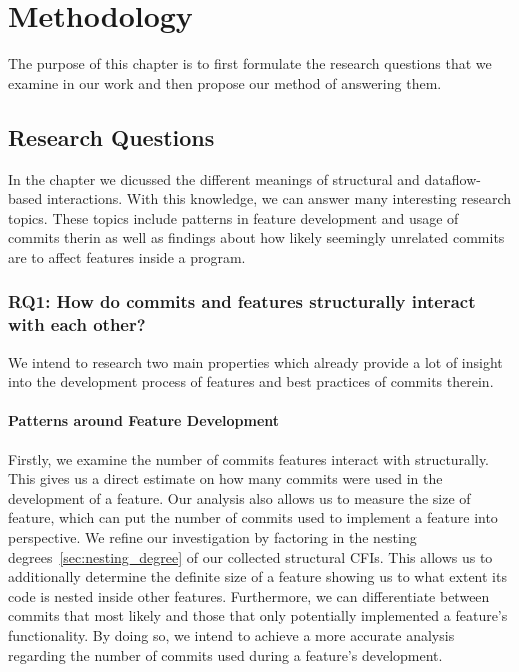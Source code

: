 \chapter{Methodology}\label{ch:methodology}

The purpose of this chapter is to first formulate the research questions that we examine in our work
and then propose our method of answering them.

\section{Research Questions}\label{sec:research_questions}

In the  chapter we dicussed the different meanings of structural and dataflow-based interactions.
With this knowledge, we can answer many interesting research topics. 
These topics include patterns in feature development and usage of commits therin as well as findings about how likely seemingly unrelated commits are to affect features inside a program.

\subsection*{\textbf{RQ1: How do commits and features structurally interact with each other?}}

We intend to research two main properties which already provide a lot of insight into the development process of features and best practices of commits therein.

\subsubsection*{Patterns around Feature Development}

Firstly, we examine the number of commits features interact with structurally. 
This gives us a direct estimate on how many commits were used in the development of a feature.
Our analysis also allows us to measure the size of feature, which can put the number of commits used to implement a feature into perspective.
We refine our investigation by factoring in the nesting degrees~\ref{sec:nesting_degree} of our collected structural CFIs.
This allows us to additionally determine the \textsf{definite} size of a feature showing us to what extent its code is nested inside other features.
Furthermore, we can differentiate between commits that most likely and those that only potentially implemented a feature's functionality.
By doing so, we intend to achieve a more accurate analysis regarding the number of commits used during a feature's development.

